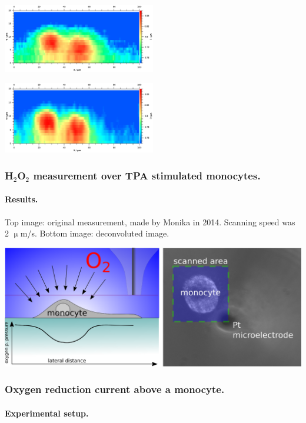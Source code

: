 \documentclass{beamer}
\begin{document}
\begin{frame}
        \centering
        \includegraphics[width=0.5\textwidth]{original.eps}
	
	\includegraphics[width=0.5\textwidth]{deconvoluted.eps}


\frametitle{H$_2$O$_2$ measurement over TPA stimulated monocytes.}
        \framesubtitle{Results.}

\vfill
Top image: original measurement, made by Monika in 2014. Scanning speed was 2 $\upmu$m/s. Bottom image: deconvoluted image.
\end{frame}


\begin{frame}
        \centering
        \includegraphics[width=1\textwidth]{oxygen.eps}

\frametitle{Oxygen reduction current above a monocyte.}
\framesubtitle{Experimental setup.}
\end{frame}
\end{document}
